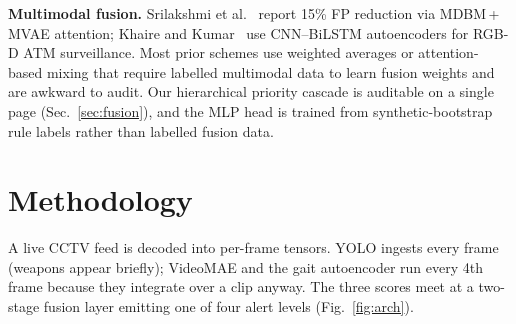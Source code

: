 \documentclass[runningheads]{llncs}
\begin{document}
\textbf{Multimodal fusion.} Srilakshmi et al.~\cite{srilakshmi2025} report 15\% FP reduction via MDBM\,+\,MVAE attention; Khaire and Kumar~\cite{khaire2022} use CNN--BiLSTM autoencoders for RGB-D ATM surveillance. Most prior schemes use weighted averages or attention-based mixing that require labelled multimodal data to learn fusion weights and are awkward to audit. Our hierarchical priority cascade is auditable on a single page (Sec.~\ref{sec:fusion}), and the MLP head is trained from synthetic-bootstrap rule labels rather than labelled fusion data.

\section{Methodology}\label{sec:method}

A live CCTV feed is decoded into per-frame tensors. YOLO ingests every frame (weapons appear briefly); VideoMAE and the gait autoencoder run every 4th frame because they integrate over a clip anyway. The three scores meet at a two-stage fusion layer emitting one of four alert levels (Fig.~\ref{fig:arch}).
\end{document}
